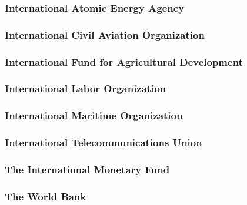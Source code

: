 \documentclass[
  openany]{book}
\begin{document}
\hypertarget{international-atomic-energy-agency}{%
\subsubsection{International Atomic Energy Agency}\label{international-atomic-energy-agency}}

\hypertarget{international-civil-aviation-organization}{%
\subsubsection{International Civil Aviation Organization}\label{international-civil-aviation-organization}}

\hypertarget{international-fund-for-agricultural-development}{%
\subsubsection{International Fund for Agricultural Development}\label{international-fund-for-agricultural-development}}

\hypertarget{international-labor-organization}{%
\subsubsection{International Labor Organization}\label{international-labor-organization}}

\hypertarget{international-maritime-organization}{%
\subsubsection{International Maritime Organization}\label{international-maritime-organization}}

\hypertarget{international-telecommunications-union}{%
\subsubsection{International Telecommunications Union}\label{international-telecommunications-union}}

\hypertarget{the-international-monetary-fund}{%
\subsubsection{The International Monetary Fund}\label{the-international-monetary-fund}}

\hypertarget{the-world-bank}{%
\subsubsection{The World Bank}\label{the-world-bank}}
\end{document}
